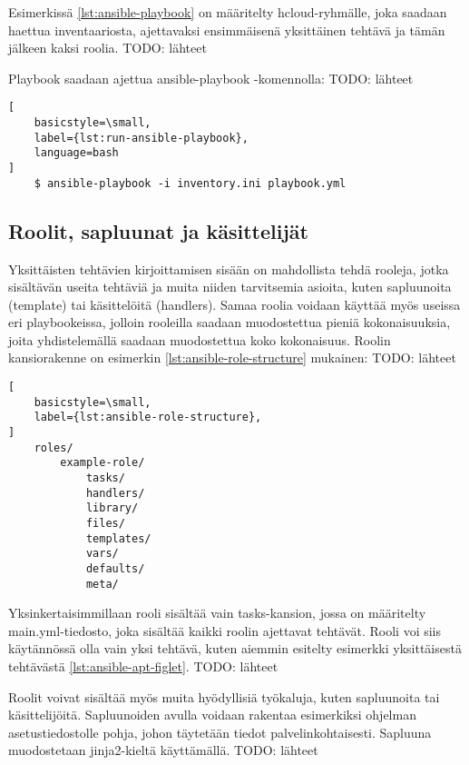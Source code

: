 Esimerkissä \ref{lst:ansible-playbook} on määritelty hcloud-ryhmälle, joka
saadaan haettua inventaariosta, ajettavaksi ensimmäisenä yksittäinen tehtävä
ja tämän jälkeen kaksi roolia.
TODO: lähteet

Playbook saadaan ajettua ansible-playbook -komennolla:
TODO: lähteet

\begin{lstlisting}[
    basicstyle=\small,
    label={lst:run-ansible-playbook},
    language=bash
]
    $ ansible-playbook -i inventory.ini playbook.yml
\end{lstlisting}

\subsection{Roolit, sapluunat ja käsittelijät}

Yksittäisten tehtävien kirjoittamisen sisään on mahdollista tehdä rooleja,
jotka sisältävän useita tehtäviä ja muita niiden tarvitsemia asioita, kuten
sapluunoita (template) tai käsittelöitä (handlers). Samaa roolia voidaan
käyttää myös useissa eri playbookeissa, jolloin rooleilla saadaan muodostettua
pieniä kokonaisuuksia, joita yhdistelemällä saadaan muodostettua koko
kokonaisuus. Roolin kansiorakenne on esimerkin \ref{lst:ansible-role-structure}
mukainen:
TODO: lähteet

\begin{lstlisting}[
    basicstyle=\small,
    label={lst:ansible-role-structure},
]
    roles/
        example-role/
            tasks/
            handlers/
            library/
            files/
            templates/
            vars/
            defaults/
            meta/
\end{lstlisting}

Yksinkertaisimmillaan rooli sisältää vain tasks-kansion, jossa on määritelty
main.yml-tiedosto, joka sisältää kaikki roolin ajettavat tehtävät. Rooli
voi siis käytännössä olla vain yksi tehtävä, kuten aiemmin esitelty esimerkki
yksittäisestä tehtävästä \ref{lst:ansible-apt-figlet}.
TODO: lähteet

Roolit voivat sisältää myös muita hyödyllisiä työkaluja, kuten sapluunoita tai
käsittelijöitä. Sapluunoiden avulla voidaan rakentaa esimerkiksi ohjelman
asetustiedostolle pohja, johon täytetään tiedot palvelinkohtaisesti. Sapluuna
muodostetaan jinja2-kieltä käyttämällä.
TODO: lähteet



